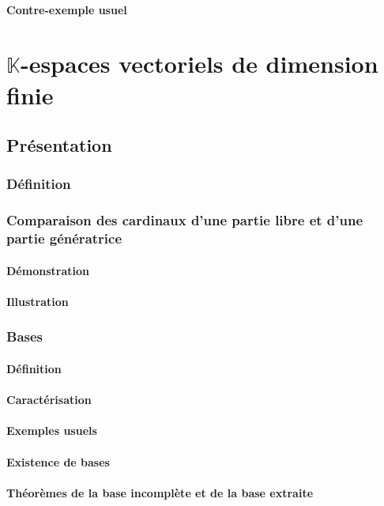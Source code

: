 \documentclass[12pt,a4paper,french]{book}
\begin{document}
			\subsubsection{Contre-exemple usuel}
			
\chapter{$\mathbb{K}$-espaces vectoriels de dimension finie}
	\section{Présentation}
		\subsection{Définition}
		\subsection{Comparaison des cardinaux d'une partie libre et d'une partie génératrice}
			\subsubsection{Démonstration}
			\subsubsection{Illustration}
		\subsection{Bases}
			\subsubsection{Définition}
			\subsubsection{Caractérisation}
			\subsubsection{Exemples usuels}
			\subsubsection{Existence de bases}
			\subsubsection{Théorèmes de la base incomplète et de la base extraite}
\end{document}
